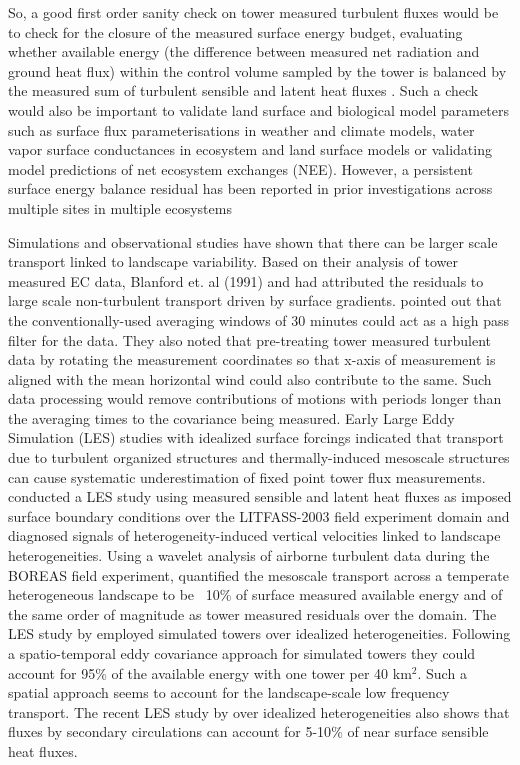 \documentclass[draft]{agujournal2019}
\begin{document}
So, a good first order sanity check on tower measured turbulent fluxes would be to check for the closure of the measured surface energy budget, evaluating whether available energy (the difference between measured net radiation and ground heat flux) within the control volume sampled by the tower is balanced by the measured sum of turbulent sensible and latent heat fluxes \cite{oncley_energy_2007,foken_energy_2008, foken_energy_2010, mauder_surface-energy-balance_2020}. Such a check would also be important to validate land surface and biological model parameters such as surface flux parameterisations in weather and climate models, water vapor surface conductances in ecosystem and land surface models or validating model predictions of net ecosystem exchanges (NEE). However, a persistent surface energy balance residual has been reported in prior investigations across multiple sites in multiple ecosystems \cite{oncley_energy_2007, foken_energy_2010, mauder_surface-energy-balance_2020} 

Simulations and observational studies have shown that there can be larger scale 
transport linked to landscape variability. Based on their analysis of tower 
measured EC data, Blanford et. al (1991) and  had attributed the residuals to large scale non-turbulent transport driven by surface gradients.  pointed out that the conventionally-used averaging windows of 30 minutes could act as a high pass filter for the data. They also noted that pre-treating tower measured turbulent data by rotating the measurement coordinates so that x-axis of measurement is aligned with the mean horizontal wind could also contribute to the same. Such data processing would remove contributions of motions with periods longer than the averaging times to the covariance being measured. Early Large Eddy Simulation (LES) studies \cite{kanda_les_2004,  inagaki_impact_2006, 
steinfeld_spatial_2007} with idealized surface forcings indicated that transport
due to turbulent organized structures and thermally-induced mesoscale structures can cause systematic underestimation of fixed point tower flux measurements. 
 conducted a LES study using measured sensible and latent heat fluxes as imposed surface boundary conditions over the LITFASS-2003 field experiment domain and diagnosed signals of heterogeneity-induced vertical velocities linked to landscape heterogeneities. Using a wavelet analysis of airborne turbulent data during the BOREAS field experiment,  quantified the  mesoscale transport across a temperate heterogeneous landscape to be ~10$\%$ of  surface measured available energy and of the  same order of magnitude as tower measured residuals over the domain. The LES study by  employed simulated towers over idealized heterogeneities. Following a spatio-temporal eddy covariance approach for simulated towers they could account for 95$\%$ of the available energy with one tower per 40 km$^2$. Such a spatial approach seems to account for the landscape-scale low frequency transport. The recent LES study by \cite{margairaz_surface_2020} over idealized heterogeneities also shows that fluxes by secondary circulations can account for 5-10$\%$ of near surface sensible heat fluxes.
\end{document}

